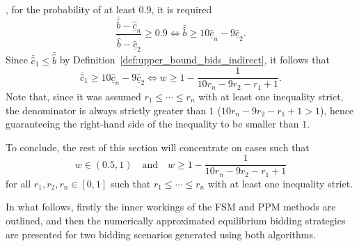 , for the probability of at least $0.9$, it is required
\begin{equation}
  \frac{\bar{\hat{b}} - \underline{\hat{c}}_n}{\bar{\hat{b}} - \underline{\hat{c}}_2} \geq 0.9 \iff \bar{\hat{b}}\geq 10\underline{\hat{c}}_n - 9\underline{\hat{c}}_2.
\end{equation}
Since $\bar{\hat{c}}_1\leq \bar{\hat{b}}$ by Definition~\ref{def:upper_bound_bids_indirect}, it follows that
\begin{equation}
  \bar{\hat{c}}_1 \geq 10\underline{\hat{c}}_n - 9\underline{\hat{c}}_2 \iff w \geq 1 - \frac{1}{10r_n - 9r_2 - r_1 + 1}.
\end{equation}
Note that, since it was assumed $r_1\leq\cdots\leq r_n$ with at least one inequality strict, the denominator is always strictly greater than $1$ ($10r_n - 9r_2-r_1+1 > 1$), hence guaranteeing the right-hand side of the inequality to be smaller than $1$.

To conclude, the rest of this section will concentrate on cases such that
\begin{equation}
  w \in (0.5, 1) \quad\textrm{and}\quad w \geq 1 - \frac{1}{10r_n - 9r_2 - r_1 + 1}
\end{equation}
for all $r_1,r_2,r_n\in [0,1]$ such that $r_1\leq\cdots\leq r_n$ with at least one inequality strict.

In what follows, firstly the inner workings of the FSM and PPM methods are outlined, and then the numerically approximated equilibrium bidding strategies are presented for two bidding scenarios generated using both algorithms. 

